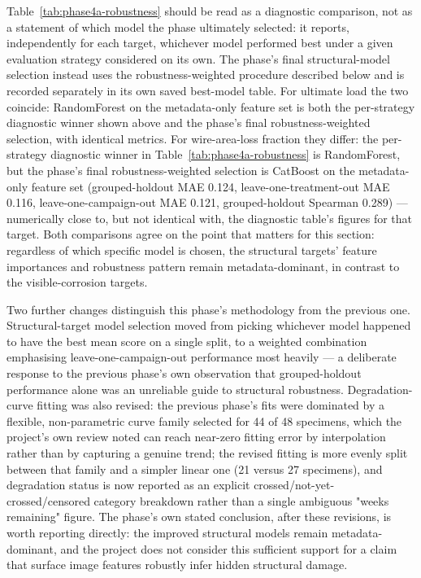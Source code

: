 Table~\ref{tab:phase4a-robustness} should be read as a diagnostic
comparison, not as a statement of which model the phase ultimately
selected: it reports, independently for each target, whichever model
performed best under a given evaluation strategy considered on its own.
The phase's final structural-model selection instead uses the
robustness-weighted procedure described below and is recorded separately
in its own saved best-model table. For ultimate load the two coincide:
RandomForest on the metadata-only feature set is both the per-strategy
diagnostic winner shown above and the phase's final robustness-weighted
selection, with identical metrics. For wire-area-loss fraction they differ:
the per-strategy diagnostic winner in Table~\ref{tab:phase4a-robustness} is
RandomForest, but the phase's final robustness-weighted selection is
CatBoost on the metadata-only feature set (grouped-holdout MAE 0.124,
leave-one-treatment-out MAE 0.116, leave-one-campaign-out MAE 0.121,
grouped-holdout Spearman 0.289) — numerically close to, but not identical
with, the diagnostic table's figures for that target. Both comparisons
agree on the point that matters for this section: regardless of which
specific model is chosen, the structural targets' feature importances and
robustness pattern remain metadata-dominant, in contrast to the
visible-corrosion targets.

Two further changes distinguish this phase's methodology from the previous
one. Structural-target model selection moved from picking whichever model
happened to have the best mean score on a single split, to a weighted
combination emphasising leave-one-campaign-out performance most heavily —
a deliberate response to the previous phase's own observation that
grouped-holdout performance alone was an unreliable guide to structural
robustness. Degradation-curve fitting was also revised: the previous
phase's fits were dominated by a flexible, non-parametric curve family
selected for 44 of 48 specimens, which the project's own review noted can
reach near-zero fitting error by interpolation rather than by capturing a
genuine trend; the revised fitting is more evenly split between that family
and a simpler linear one (21 versus 27 specimens), and degradation status
is now reported as an explicit crossed/not-yet-crossed/censored category
breakdown rather than a single ambiguous "weeks remaining" figure. The
phase's own stated conclusion, after these revisions, is worth reporting
directly: the improved structural models remain metadata-dominant, and the
project does not consider this sufficient support for a claim that surface
image features robustly infer hidden structural damage.

